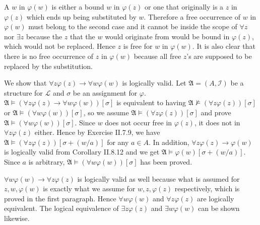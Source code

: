 \documentclass[12pt]{article}
\theoremstyle{definition}
\newenvironment{customthm}[1]
  {\renewcommand\theinnercustomthm{#1}\innercustomthm}
  {\endinnercustomthm}
\begin{document}
\begin{customthm}{II.8.25} A $w$ in $\varphi(w)$ is either a bound $w$ in $\varphi(z)$ or one that originally is a $z$ in $\varphi(z)$ which ends up being substituted by $w$. Therefore a free occurrence of $w$ in $\varphi(w)$ must belong to the second case and it cannot be inside the scope of $\forall z$ nor $\exists z$ because the $z$ that the $w$ would originate from would be bound in $\varphi(z)$, which would not be replaced. Hence $z$ is free for $w$ in $\varphi(w)$. It is also clear that there is no free occurrence of $z$ in $\varphi(w)$ because all free $z$'s are supposed to be replaced by the substitution.

We show that $\forall z\varphi(z)\rightarrow\forall w\varphi(w)$ is logically valid. Let $\mathfrak{A}=(A,\mathcal{I})$ be a structure for $\mathcal{L}$ and $\sigma$ be an assignment for $\varphi$. $\mathfrak{A}\models(\forall z\varphi(z)\rightarrow\forall w\varphi(w))[\sigma]$ is equivalent to having $\mathfrak{A}\not\models(\forall z\varphi(z))[\sigma]$ or $\mathfrak{A}\models(\forall w\varphi(w))[\sigma]$, so we assume $\mathfrak{A}\models(\forall z\varphi(z))[\sigma]$ and prove $\mathfrak{A}\models(\forall w\varphi(w))[\sigma]$. Since $w$ does not occur free in $\varphi(z)$, it does not in $\forall z\varphi(z)$ either. Hence by Exercise II.7.9, we have $\mathfrak{A}\models(\forall z\varphi(z))[\sigma+(w/a)]$ for any $a\in A$. In addition, $\forall z\varphi(z)\rightarrow\varphi(w)$ is logically valid from Corollary II.8.12 and we get $\mathfrak{A}\models\varphi(w)[\sigma+(w/a)]$. Since $a$ is arbitrary, $\mathfrak{A}\models(\forall w\varphi(w))[\sigma]$ has been proved.

$\forall w\varphi(w)\rightarrow\forall z\varphi(z)$ is logically valid as well because what is assumed for $z,w,\varphi(w)$ is exactly what we assume for $w,z,\varphi(z)$ respectively, which is proved in the first paragraph. Hence $\forall w\varphi(w)$ and $\forall z\varphi(z)$ are logically equivalent. The logical equivalence of $\exists z\varphi(z)$ and $\exists w\varphi(w)$ can be shown likewise.
\end{customthm}
\end{document}
